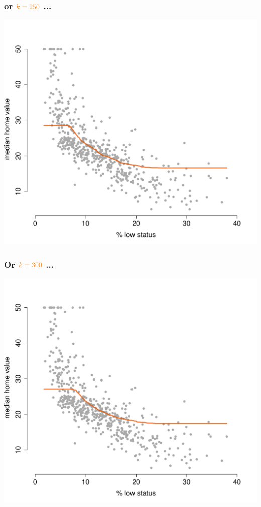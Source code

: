 \documentclass{beamer}
\newcommand{\bo}[1]{\textcolor{burntorange}{#1}}
\begin{document}
\begin{frame}[plain]
\frametitle{or $\bo{k=250}$ ...}
\vspace{-8mm}
\begin{center}
\includegraphics[scale=.44]{DaveBostonplotk=250i=7.pdf}
\end{center}
\end{frame}

\begin{frame}[plain]
\frametitle{Or $\bo{k=300}$ ...}
\vspace{-8mm}
\begin{center}
\includegraphics[scale=.44]{DaveBostonplotk=300i=8.pdf}
\end{center}
\end{frame}
\end{document}
